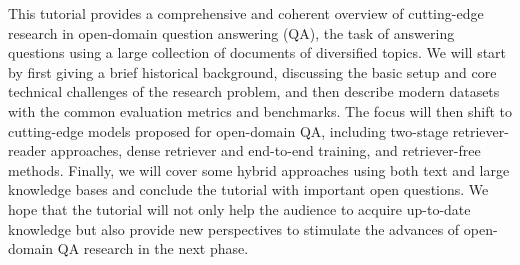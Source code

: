 This tutorial provides a comprehensive and coherent overview of cutting-edge research in open-domain question answering (QA), the task of answering questions using a large collection of documents of diversified topics. We will start by first giving a brief historical background, discussing the basic setup and core technical challenges of the research problem, and then describe modern datasets with the common evaluation metrics and benchmarks.  The focus will then shift to cutting-edge models proposed for open-domain QA, including two-stage retriever-reader approaches, dense retriever and end-to-end training, and retriever-free methods.  Finally, we will cover some hybrid approaches using both text and large knowledge bases and conclude the tutorial with important open questions.  We hope that the tutorial will not only help the audience to acquire up-to-date knowledge but also provide new perspectives to stimulate the advances of open-domain QA research in the next phase.
